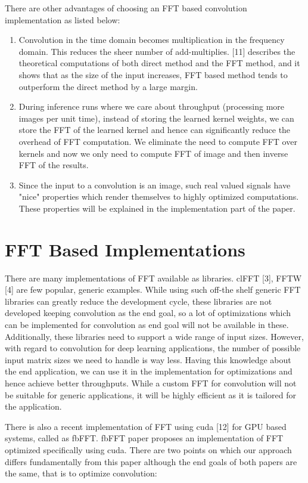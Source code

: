 \documentclass[sigconf]{acmart}
\begin{document}
There are other advantages of choosing an FFT based convolution implementation as listed below:
\begin{enumerate}
\item Convolution in the time domain becomes multiplication in the frequency domain. This reduces the sheer number of add-multiplies. [11] describes the theoretical computations of both direct method and the FFT method, and it shows that as the size of the input increases, FFT based method tends to outperform the direct method by a large margin.
\item During inference runs where we care about throughput (processing more images per unit time), instead of storing the learned kernel weights, we can store the FFT of the learned kernel and hence can significantly reduce the overhead of FFT computation. We eliminate the need to compute FFT over kernels and now we only need to compute FFT of image and then inverse FFT of the results.
\item Since the input to a convolution is an image, such real valued signals have "nice" properties which render themselves to highly optimized computations. These properties will be explained in the implementation part of the paper.
\end{enumerate}

\section{FFT Based Implementations}
There are many implementations of FFT available as libraries. clFFT [3], FFTW [4] are few popular, generic examples. While using such off-the shelf generic FFT libraries can greatly reduce the development cycle, these libraries are not developed keeping convolution as the end goal,  so a lot of optimizations which can be implemented for convolution as end goal will not be available in these. Additionally, these libraries need to support a wide range of input sizes. However, with regard to convolution for deep learning applications, the number of possible input matrix sizes we need to handle is way less. Having this knowledge about the end application, we can use it in the implementation for optimizations and hence achieve better throughputs. While a custom FFT for convolution will not be suitable for generic applications, it will be highly efficient as it is tailored for the application.

There is also a recent implementation of FFT using cuda [12] for GPU based systems, called as fbFFT. fbFFT paper proposes an implementation of FFT optimized specifically using cuda. There are two points on which our approach differs fundamentally from this paper although the end goals of both papers are the same, that is to optimize convolution:
\end{document}
